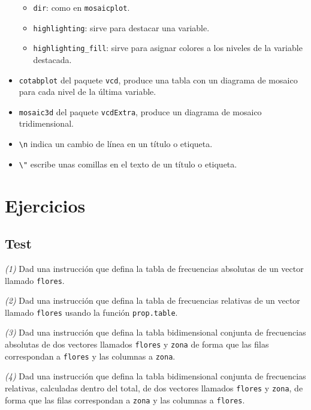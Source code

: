 \documentclass[]{book}
\providecommand{\tightlist}{%
  \setlength{\itemsep}{0pt}\setlength{\parskip}{0pt}}
\theoremstyle{definition}
\theoremstyle{definition}
\theoremstyle{definition}
\theoremstyle{remark}
\begin{document}
\begin{itemize}
  \begin{itemize}
  \tightlist
  \item
    \texttt{dir}: como en \texttt{mosaicplot}.
  \item
    \texttt{highlighting}: sirve para destacar una variable.
  \item
    \texttt{highlighting\_fill}: sirve para asignar colores a los niveles de la variable destacada.
  \end{itemize}
\item
  \texttt{cotabplot} del paquete \texttt{vcd}, produce una tabla con un diagrama de mosaico para cada nivel de la última variable.
\item
  \texttt{mosaic3d} del paquete \texttt{vcdExtra}, produce un diagrama de mosaico tridimensional.
\item
  \texttt{\textbackslash{}n} indica un cambio de línea en un título o etiqueta.
\item
  \texttt{\textbackslash{}"} escribe unas comillas en el texto de un título o etiqueta.
\end{itemize}

\hypertarget{ejercicios-8}{%
\section{Ejercicios}\label{ejercicios-8}}

\hypertarget{test-7}{%
\subsection*{Test}\label{test-7}}

\emph{(1)} Dad una instrucción que defina la tabla de frecuencias absolutas de un vector llamado \texttt{flores}.

\emph{(2)} Dad una instrucción que defina la tabla de frecuencias relativas de un vector llamado \texttt{flores} usando la función \texttt{prop.table}.

\emph{(3)} Dad una instrucción que defina la tabla bidimensional conjunta de frecuencias absolutas de dos vectores llamados \texttt{flores} y \texttt{zona} de forma que las filas correspondan a \texttt{flores} y las columnas a \texttt{zona}.

\emph{(4)} Dad una instrucción que defina la tabla bidimensional conjunta de frecuencias relativas, calculadas dentro del total, de dos vectores llamados \texttt{flores} y \texttt{zona}, de forma que las filas correspondan a \texttt{zona} y las columnas a \texttt{flores}.
\end{document}
